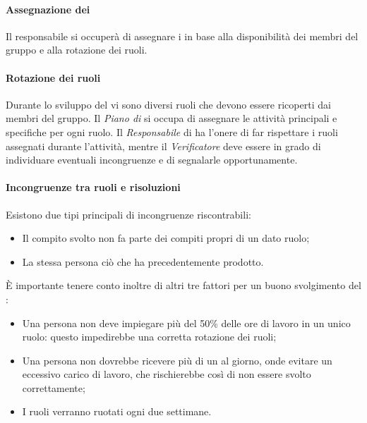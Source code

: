 \paragraph*{Assegnazione dei } Il responsabile si occuperà di assegnare i  in base alla disponibilità dei membri del gruppo e alla rotazione dei ruoli.

\paragraph*{Rotazione dei ruoli}

Durante lo sviluppo del  vi sono diversi ruoli che devono essere ricoperti dai membri del gruppo. Il \textit{Piano di } si occupa di assegnare le attività principali e specifiche per ogni ruolo. Il \textit{Responsabile} di  ha l'onere di far rispettare i ruoli assegnati durante l'attività, mentre il \textit{Verificatore} deve essere in grado di individuare eventuali incongruenze e di segnalarle opportunamente.
\paragraph*{Incongruenze tra ruoli e risoluzioni}
Esistono due tipi principali di incongruenze riscontrabili:
\begin{itemize}

\item Il compito svolto non fa parte dei compiti propri di un dato ruolo;
\item La stessa persona  ciò che ha precedentemente prodotto.
\end{itemize}

È importante tenere conto inoltre di altri tre fattori per un buono svolgimento del :
\begin{itemize}

\item Una persona non deve impiegare più del 50\% delle ore di lavoro in un unico ruolo: questo impedirebbe una corretta rotazione dei ruoli;
\item Una persona non dovrebbe ricevere più di un  al giorno, onde evitare un eccessivo carico di lavoro, che rischierebbe cos\`i di non essere svolto correttamente;
\item I ruoli verranno ruotati ogni due settimane.

\end{itemize}

